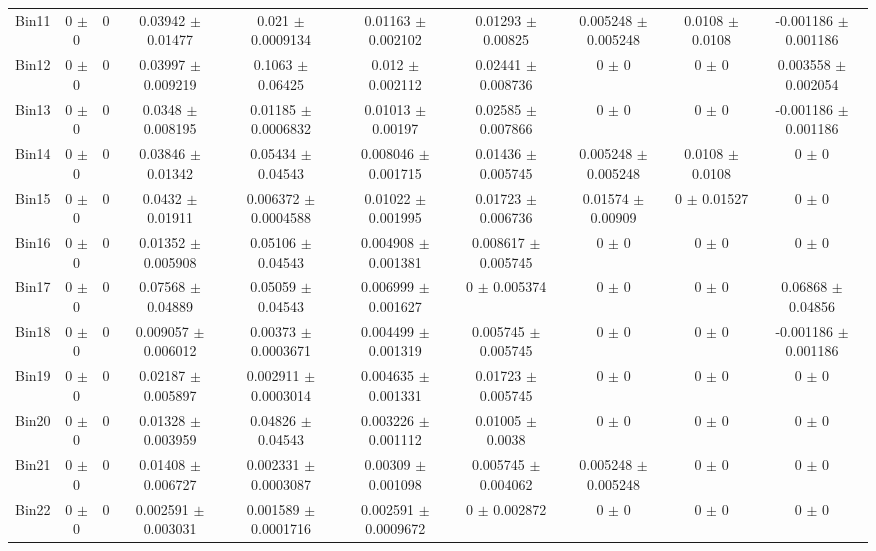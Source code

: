 \begin{tabular}{@{\extracolsep{4pt}}lccccccccc@{}}
     Bin11 & 0 $\pm$ 0 & 0 & 0.03942 $\pm$ 0.01477 & 0.021 $\pm$ 0.0009134 & 0.01163 $\pm$ 0.002102 & 0.01293 $\pm$ 0.00825 & 0.005248 $\pm$ 0.005248 & 0.0108 $\pm$ 0.0108 & -0.001186 $\pm$ 0.001186 \\ 
     Bin12 & 0 $\pm$ 0 & 0 & 0.03997 $\pm$ 0.009219 & 0.1063 $\pm$ 0.06425 & 0.012 $\pm$ 0.002112 & 0.02441 $\pm$ 0.008736 & 0 $\pm$ 0 & 0 $\pm$ 0 & 0.003558 $\pm$ 0.002054 \\ 
     Bin13 & 0 $\pm$ 0 & 0 & 0.0348 $\pm$ 0.008195 & 0.01185 $\pm$ 0.0006832 & 0.01013 $\pm$ 0.00197 & 0.02585 $\pm$ 0.007866 & 0 $\pm$ 0 & 0 $\pm$ 0 & -0.001186 $\pm$ 0.001186 \\ 
     Bin14 & 0 $\pm$ 0 & 0 & 0.03846 $\pm$ 0.01342 & 0.05434 $\pm$ 0.04543 & 0.008046 $\pm$ 0.001715 & 0.01436 $\pm$ 0.005745 & 0.005248 $\pm$ 0.005248 & 0.0108 $\pm$ 0.0108 & 0 $\pm$ 0 \\ 
     Bin15 & 0 $\pm$ 0 & 0 & 0.0432 $\pm$ 0.01911 & 0.006372 $\pm$ 0.0004588 & 0.01022 $\pm$ 0.001995 & 0.01723 $\pm$ 0.006736 & 0.01574 $\pm$ 0.00909 & 0 $\pm$ 0.01527 & 0 $\pm$ 0 \\ 
     Bin16 & 0 $\pm$ 0 & 0 & 0.01352 $\pm$ 0.005908 & 0.05106 $\pm$ 0.04543 & 0.004908 $\pm$ 0.001381 & 0.008617 $\pm$ 0.005745 & 0 $\pm$ 0 & 0 $\pm$ 0 & 0 $\pm$ 0 \\ 
     Bin17 & 0 $\pm$ 0 & 0 & 0.07568 $\pm$ 0.04889 & 0.05059 $\pm$ 0.04543 & 0.006999 $\pm$ 0.001627 & 0 $\pm$ 0.005374 & 0 $\pm$ 0 & 0 $\pm$ 0 & 0.06868 $\pm$ 0.04856 \\ 
     Bin18 & 0 $\pm$ 0 & 0 & 0.009057 $\pm$ 0.006012 & 0.00373 $\pm$ 0.0003671 & 0.004499 $\pm$ 0.001319 & 0.005745 $\pm$ 0.005745 & 0 $\pm$ 0 & 0 $\pm$ 0 & -0.001186 $\pm$ 0.001186 \\ 
     Bin19 & 0 $\pm$ 0 & 0 & 0.02187 $\pm$ 0.005897 & 0.002911 $\pm$ 0.0003014 & 0.004635 $\pm$ 0.001331 & 0.01723 $\pm$ 0.005745 & 0 $\pm$ 0 & 0 $\pm$ 0 & 0 $\pm$ 0 \\ 
     Bin20 & 0 $\pm$ 0 & 0 & 0.01328 $\pm$ 0.003959 & 0.04826 $\pm$ 0.04543 & 0.003226 $\pm$ 0.001112 & 0.01005 $\pm$ 0.0038 & 0 $\pm$ 0 & 0 $\pm$ 0 & 0 $\pm$ 0 \\ 
     Bin21 & 0 $\pm$ 0 & 0 & 0.01408 $\pm$ 0.006727 & 0.002331 $\pm$ 0.0003087 & 0.00309 $\pm$ 0.001098 & 0.005745 $\pm$ 0.004062 & 0.005248 $\pm$ 0.005248 & 0 $\pm$ 0 & 0 $\pm$ 0 \\ 
     Bin22 & 0 $\pm$ 0 & 0 & 0.002591 $\pm$ 0.003031 & 0.001589 $\pm$ 0.0001716 & 0.002591 $\pm$ 0.0009672 & 0 $\pm$ 0.002872 & 0 $\pm$ 0 & 0 $\pm$ 0 & 0 $\pm$ 0 \\ 

\end{tabular}
